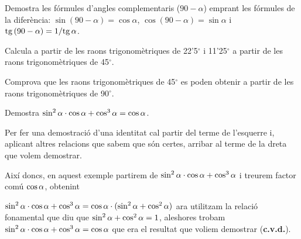 \begin{mylist}
	
	\exer
	Demostra les fórmules d'angles complementaris ($90-\alpha$) emprant les fórmules de la
	diferència: $\sin(90-\alpha)=\cos\alpha$, $\cos(90-\alpha)=\sin\alpha$ i $\mathrm{tg}\,(90-\alpha)=1/\mathrm{tg}\,\alpha$.
	
	
	\exer
	Calcula a partir de les raons trigonomètriques de
	22'5${}^\circ$ i 11'25${}^\circ$ a partir de les
	raons trigonomètriques de 45${}^\circ$.
		
	
	
	
	\exer
	Comprova que les raons trigonomètriques de 45${}^\circ$ es
	poden obtenir a partir de les raons trigonomètriques de 90${}^\circ$.
	
	
	\exer[-1] Demostra $\sin^2 \alpha \cdot \cos \alpha + \cos^3 \alpha= \cos \alpha$. 
	
	\end{mylist}
	
	\begin{example}
		Per fer una demostració d'una identitat cal partir del terme de l'esquerre i, aplicant altres relacions que sabem que són certes, arribar al terme de la dreta que volem demostrar. 
		
		Així doncs, en aquest exemple partirem de $\sin^2 \alpha \cdot \cos \alpha + \cos^3 \alpha$ i treurem factor comú $\cos \alpha$, obtenint
		
		$\sin^2 \alpha \cdot \cos \alpha + \cos^3 \alpha = \cos\alpha \cdot (\sin^2 \alpha + \cos^2 \alpha)$ ara utilitzam la relació fonamental que diu que $\sin^2 \alpha + \cos^2 \alpha=1$, aleshores trobam $\sin^2 \alpha \cdot \cos \alpha + \cos^3 \alpha = \cos\alpha$ que era el resultat que voliem demostrar (\textbf{c.v.d.}).
		
	\end{example}
	
